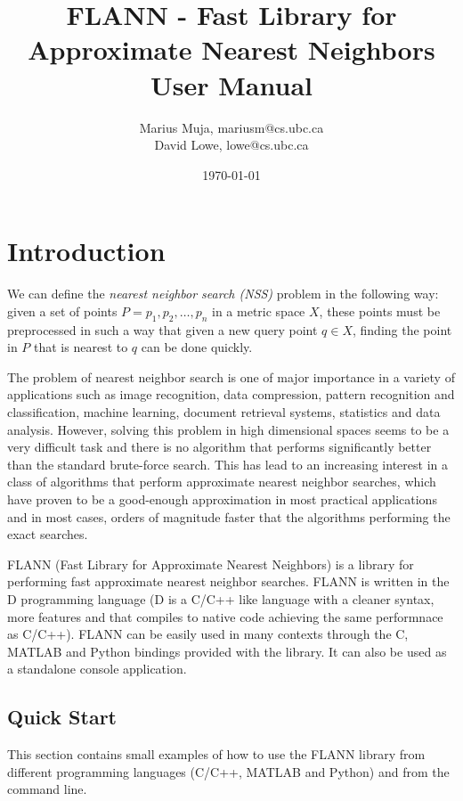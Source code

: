 \documentclass[letter,10pt]{article}
\title{FLANN - Fast Library for Approximate Nearest Neighbors\\[0.5cm] User
Manual\\[1cm]}
\author{Marius Muja, mariusm@cs.ubc.ca\\David Lowe, lowe@cs.ubc.ca}
\date{\today}
\begin{document}
 \begin{titlepage}
\vspace{10cm}
\maketitle
\thispagestyle{empty}
 \end{titlepage}


\section{Introduction}

We can define the \emph{nearest neighbor search (NSS)} problem in the
following way: given a set of points $P=p_1,p_2,\dots,p_n$ in a metric
space $X$, these points must be preprocessed in such a way that given a new
query point $q \in X$, finding the point in $P$ that is nearest to $q$ can
be done quickly.

The problem of nearest neighbor search is one of major importance in a
variety of applications such as image recognition, data compression,
pattern recognition and classification, machine learning,  document
retrieval systems, statistics and data analysis. However, solving this
problem in high dimensional spaces seems to be a very difficult task and
there is no algorithm that performs significantly better than the standard
brute-force search. This has lead to an increasing interest in a class of
algorithms that perform approximate nearest neighbor searches, which have
proven to be a good-enough approximation in most practical applications and
in most cases, orders of magnitude faster that the algorithms performing
the exact searches.

FLANN (Fast Library for Approximate Nearest Neighbors) is a library for
performing fast approximate nearest neighbor searches. FLANN is written in
the D programming language (D is a C/C++ like language with a cleaner
syntax, more features and that compiles to native code achieving the same
 performnace as C/C++). FLANN can be easily used in many contexts
through the C, MATLAB and Python bindings provided with the library. It
can also be used as a standalone console application.



\subsection{Quick Start}
\label{sec:quickstart}


This section contains small examples of how to use the FLANN library from
different programming languages (C/C++, MATLAB and Python) and from the
command line.
\end{document}
